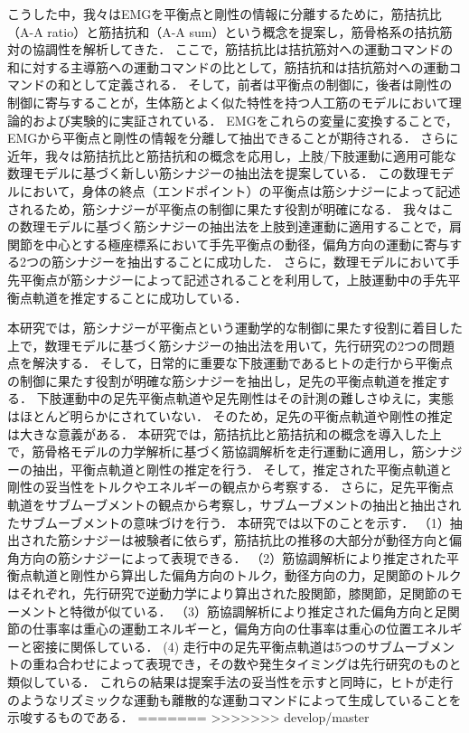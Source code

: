 こうした中，我々はEMGを平衡点と剛性の情報に分離するために，筋拮抗比（A-A ratio）と筋拮抗和（A-A sum）という概念を提案し，筋骨格系の拮抗筋対の協調性を解析してきた\cite{Hirai2010,Iimura2011,Inoue2012,Ariga2013,Uno2014}．
ここで，筋拮抗比は拮抗筋対への運動コマンドの和に対する主導筋への運動コマンドの比として，筋拮抗和は拮抗筋対への運動コマンドの和として定義される．
そして，前者は平衡点の制御に，後者は剛性の制御に寄与することが，生体筋とよく似た特性を持つ人工筋のモデルにおいて理論的および実験的に実証されている\cite{Ariga2013}．
EMGをこれらの変量に変換することで，EMGから平衡点と剛性の情報を分離して抽出できることが期待される．
さらに近年，我々は筋拮抗比と筋拮抗和の概念を応用し，上肢/下肢運動に適用可能な数理モデルに基づく新しい筋シナジーの抽出法を提案している\cite{Uno2014}．
この数理モデルにおいて，身体の終点（エンドポイント）の平衡点は筋シナジーによって記述されるため，筋シナジーが平衡点の制御に果たす役割が明確になる．
我々はこの数理モデルに基づく筋シナジーの抽出法を上肢到達運動に適用することで，肩関節を中心とする極座標系において手先平衡点の動径，偏角方向の運動に寄与する2つの筋シナジーを抽出することに成功した\cite{Uno2014}．
さらに，数理モデルにおいて手先平衡点が筋シナジーによって記述されることを利用して，上肢運動中の手先平衡点軌道を推定することに成功している．

本研究では，筋シナジーが平衡点という運動学的な制御に果たす役割に着目した上で，数理モデルに基づく筋シナジーの抽出法を用いて，先行研究の2つの問題点を解決する．
そして，日常的に重要な下肢運動であるヒトの走行から平衡点の制御に果たす役割が明確な筋シナジーを抽出し，足先の平衡点軌道を推定する．
下肢運動中の足先平衡点軌道や足先剛性はその計測の難しさゆえに，実態はほとんど明らかにされていない．
そのため，足先の平衡点軌道や剛性の推定は大きな意義がある．
本研究では，筋拮抗比と筋拮抗和の概念を導入した上で，筋骨格モデルの力学解析に基づく筋協調解析を走行運動に適用し，筋シナジーの抽出，平衡点軌道と剛性の推定を行う．
そして，推定された平衡点軌道と剛性の妥当性をトルクやエネルギーの観点から考察する．
さらに，足先平衡点軌道をサブムーブメントの観点から考察し，サブムーブメントの抽出と抽出されたサブムーブメントの意味づけを行う．
本研究では以下のことを示す．
（1）抽出された筋シナジーは被験者に依らず，筋拮抗比の推移の大部分が動径方向と偏角方向の筋シナジーによって表現できる．
（2）筋協調解析により推定された平衡点軌道と剛性から算出した偏角方向のトルク，動径方向の力，足関節のトルクはそれぞれ，先行研究で逆動力学により算出された股関節，膝関節，足関節のモーメントと特徴が似ている．
（3）筋協調解析により推定された偏角方向と足関節の仕事率は重心の運動エネルギーと，偏角方向の仕事率は重心の位置エネルギーと密接に関係している．
 (4) 走行中の足先平衡点軌道は5つのサブムーブメントの重ね合わせによって表現でき，その数や発生タイミングは先行研究のものと類似している．
これらの結果は提案手法の妥当性を示すと同時に，ヒトが走行のようなリズミックな運動も離散的な運動コマンドによって生成していることを示唆するものである．
=======
>>>>>>> develop/master

